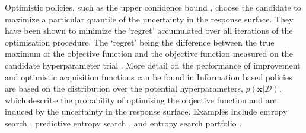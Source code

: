 Optimistic policies, such as the upper confidence bound \cite{icml2010_129}, choose the candidate to maximize a particular quantile of the uncertainty in the response surface. They have been shown to minimize the `regret' accumulated over all iterations of the optimisation procedure.\cite{icml2010_129} The `regret' being the difference between the true maximum of the objective function and the objective function measured on the candidate hyperparameter trial \cite{berger2013statistical}. More detail on the performance of improvement and optimistic acquisition functions can be found in \cite{jones2001taxonomy} Information based policies are based on the distribution over the potential hyperparameters, $p(\mathbf{x}|\mathcal{D})$, which describe the probability of optimising the objective function and are induced by the uncertainty in the response surface.\cite{shahriariTakingHumanOut2016} Examples include entropy search \cite{hennig2012entropy}, predictive entropy search \cite{hernandez2014predictive}, and entropy search portfolio \cite{shahriariEntropySearchPortfolio2015}. 

